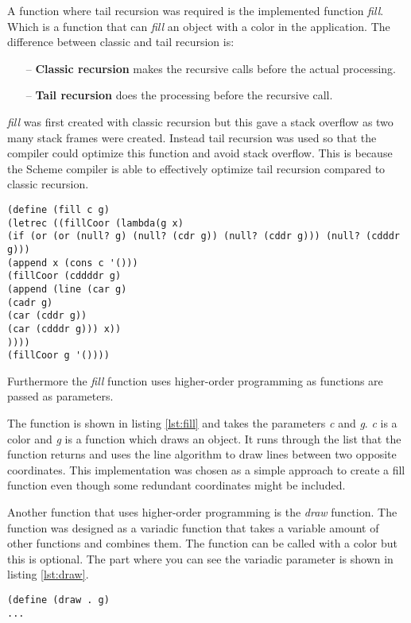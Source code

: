 A function where tail recursion was required is the implemented function \emph{fill}. Which is a function that can \emph{fill} an object with a color in the application. The difference between classic and tail recursion is:
\begin{itemize}
	\item[--] \textbf{Classic recursion} makes the recursive calls before the actual processing.
	\item[--] \textbf{Tail recursion} does the processing before the recursive call.  
\end{itemize}

\emph{fill} was first created with classic recursion but this gave a stack overflow as two many stack frames were created. Instead tail recursion was used so that the compiler could optimize this function and avoid stack overflow.  This is because the Scheme compiler is able to effectively optimize tail recursion compared to classic recursion.

\newpage
\vspace{-1.4em}
\begin{lstlisting}[caption={Scheme function fill}, label=lst:fill]
(define (fill c g)
(letrec ((fillCoor (lambda(g x)
(if (or (or (null? g) (null? (cdr g)) (null? (cddr g))) (null? (cdddr g)))
(append x (cons c '()))
(fillCoor (cddddr g)
(append (line (car g)
(cadr g)
(car (cddr g))
(car (cdddr g))) x))
))))
(fillCoor g '())))
\end{lstlisting}

Furthermore the \emph{fill} function uses higher-order programming as functions are passed as parameters. 

The function is shown in listing \ref{lst:fill} and takes the parameters \emph{c} and \emph{g}. \emph{c} is a color and \emph{g} is a function which draws an object. It runs through the list that the function returns and uses the line algorithm to draw lines between two opposite coordinates. This implementation was chosen as a simple approach to create a fill function even though some redundant coordinates might be included. 

Another function that uses higher-order programming is the \emph{draw} function. The function was designed as a variadic function that takes a variable amount of other functions and combines them. The function can be called with a color but this is optional. The part where you can see the variadic parameter is shown 
in listing \ref{lst:draw}.
 
\begin{lstlisting}[caption={Example of a variadic function}, label=lst:draw]
(define (draw . g)
...
\end{lstlisting}